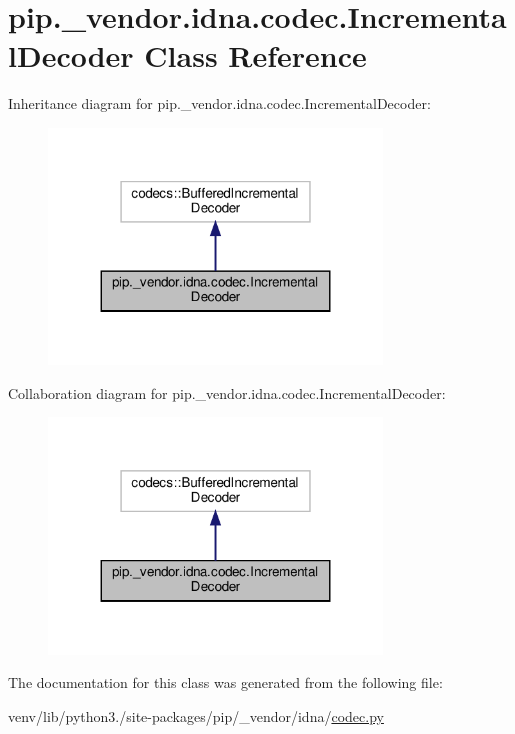 \hypertarget{classpip_1_1__vendor_1_1idna_1_1codec_1_1IncrementalDecoder}{}\section{pip.\+\_\+vendor.\+idna.\+codec.\+Incremental\+Decoder Class Reference}
\label{classpip_1_1__vendor_1_1idna_1_1codec_1_1IncrementalDecoder}


Inheritance diagram for pip.\+\_\+vendor.\+idna.\+codec.\+Incremental\+Decoder\+:
\nopagebreak
\begin{figure}[H]
\begin{center}
\leavevmode
\includegraphics[width=251pt]{classpip_1_1__vendor_1_1idna_1_1codec_1_1IncrementalDecoder__inherit__graph}
\end{center}
\end{figure}


Collaboration diagram for pip.\+\_\+vendor.\+idna.\+codec.\+Incremental\+Decoder\+:
\nopagebreak
\begin{figure}[H]
\begin{center}
\leavevmode
\includegraphics[width=251pt]{classpip_1_1__vendor_1_1idna_1_1codec_1_1IncrementalDecoder__coll__graph}
\end{center}
\end{figure}


The documentation for this class was generated from the following file\+:\begin{DoxyCompactItemize}
\item 
venv/lib/python3./site-\/packages/pip/\+\_\+vendor/idna/\hyperlink{codec_8py}{codec.\+py}\end{DoxyCompactItemize}
